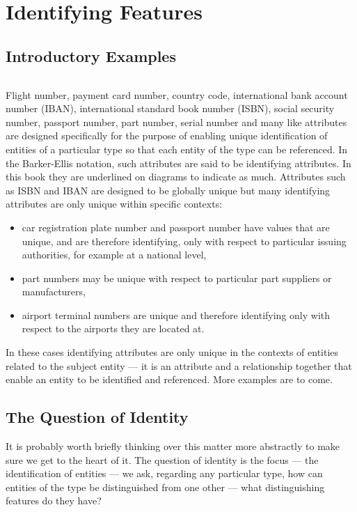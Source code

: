 \section{Identifying Features}
\label{IdentifyingFeatures}

\subsection{Introductory Examples}

\begin{equation}

\end{equation}

\mynote
Flight number, payment card number, country code, international bank account number (IBAN), 
international standard book number (ISBN), social security number, passport number, part number, serial number and many like attributes are designed specifically for the purpose of enabling unique identification of entities of a particular type so that each entity of the type can be referenced. 
In the Barker-Ellis notation, such attributes are said to be identifying attributes. In this book they are underlined 
on diagrams to indicate as much. 
Attributes such as ISBN and IBAN are designed to be globally unique but many identifying attributes are only unique within specific contexts:
\begin{itemize}
\item
car registration plate number and passport number have values that are unique, and are therefore identifying, only with respect to particular issuing authorities, for example at a national level,
\item part numbers may be unique with respect to particular part suppliers or manufacturers,
\item airport terminal numbers are unique and therefore identifying only with respect to the airports they are located at.
\end{itemize}
In these cases identifying attributes are only unique in the contexts of entities related to the subject entity --- it is an attribute and a relationship together that enable an entity to be identified and referenced. More examples are to come.

\subsection{The Question of Identity}
\mynote
It is probably worth briefly thinking over this matter more abstractly to make sure we get to the heart of it. The question of identity is the focus --- the identification of entities ---  we ask, regarding any particular type, how can entities of the type be distinguished from one other 
--- what distinguishing features do they have? 

